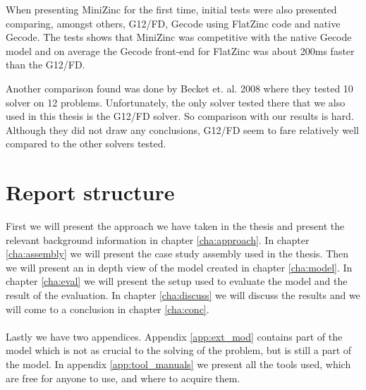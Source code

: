 When presenting MiniZinc for the first time, initial tests were also presented comparing, amongst others, G12/FD, Gecode using FlatZinc code and native Gecode. The tests shows that MiniZinc was competitive with the native Gecode model and on average the Gecode front-end for FlatZinc was about 200ms faster than the G12/FD.\cite{mz_paper}

Another comparison found was done by Becket et. al. 2008 where they tested 10 solver on 12 problems. Unfortunately, the only solver tested there that we also used in this thesis is the G12/FD solver. So comparison with our results is hard. Although they did not draw any conclusions, G12/FD seem to fare relatively well compared to the other solvers tested.\cite{nicta_2964}


\section{Report structure}
First we will present the approach we have taken in the thesis and present the relevant background information in chapter \ref{cha:approach}. In chapter \ref{cha:assembly} we will present the case study assembly used in the thesis. Then we will present an in depth view of the model created in chapter \ref{cha:model}.  In chapter \ref{cha:eval} we will present the setup used to evaluate the model and the result of the evaluation. In chapter \ref{cha:discuss} we will discuss the results and we will come to a conclusion in chapter \ref{cha:conc}.
\\\\
Lastly we have two appendices. Appendix \ref{app:ext_mod} contains part of the model which is not as crucial to the solving of the problem, but is still a part of the model. In appendix \ref{app:tool_manuals} we present all the tools used, which are free for anyone to use, and where to acquire them.
